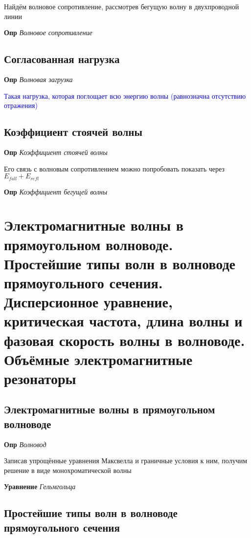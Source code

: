 \documentclass[a4paper, 14pt]{article}
\begin{document}
    Найдём волновое сопротивление, рассмотрев бегущую волну в двухпроводной линии
    
    \textbf{Опр} \textit{Волновое сопротивление}
    
    \subsection{Согласованная нагрузка}
    
    \textbf{Опр} \textit{Волновая загрузка}
    
    \textcolor{blue}{Такая нагрузка, которая поглощает всю энергию волны (равнозначна отсутствию отражения)}
    
    \subsection{Коэффициент стоячей волны}
    
    \textbf{Опр} \textit{Коэффициент стоячей волны}
    
    Его связь с волновым сопротивлением можно попробовать показать через $E_{fall} + E_{refl}$
    
    \textbf{Опр} \textit{Коэффициент бегущей волны}
    
    \section{Электромагнитные волны в прямоугольном волноводе.
    Простейшие типы волн в волноводе прямоугольного сечения.
    Дисперсионное уравнение, критическая частота, длина волны и фазовая скорость волны в волноводе.
    Объёмные электромагнитные резонаторы}
    
    \subsection{Электромагнитные волны в прямоугольном волноводе}
    
    \textbf{Опр} \textit{Волновод}
    
    Записав упрощённые уравнения Максвелла и граничные условия к ним, получим решение в виде монохроматической волны
    
    \textbf{Уравнение} \textit{Гельмгольца}
    
    \subsection{Простейшие типы волн в волноводе прямоугольного сечения}
    
\end{document}
